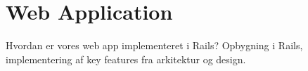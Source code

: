\chapter{Web Application}
Hvordan er vores web app implementeret i Rails? Opbygning i Rails, implementering af key features fra arkitektur og design. 
